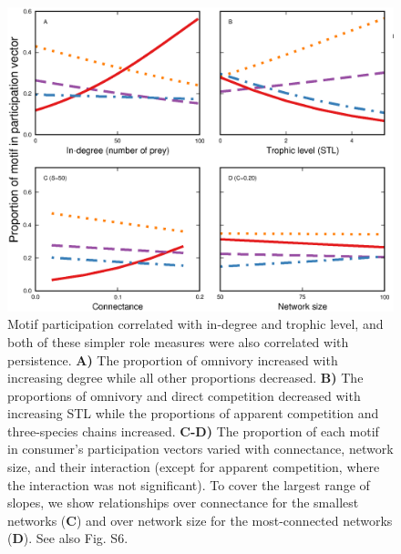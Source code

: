 \documentclass[12pt]{article}
\begin{document}
\begin{spacing}{2.0}
    \begin{figure}[hb!]
        \centering
        \includegraphics[width=\textwidth]{figures/roles_vs_TL.eps}
        \caption{Motif participation correlated with in-degree and trophic level, and both of these simpler role measures were also correlated with persistence. \textbf{A)} The proportion of omnivory increased with increasing degree while all other proportions decreased. \textbf{B)} The proportions of omnivory and direct competition decreased with increasing STL while the proportions of apparent competition and three-species chains increased. \textbf{C-D)} The proportion of each motif in consumer's participation vectors varied with connectance, network size, and their interaction (except for apparent competition, where the interaction was not significant). To cover the largest range of slopes, we show relationships over connectance for the smallest networks (\textbf{C}) and over network size for the most-connected networks (\textbf{D}). See also Fig. S6.}
        \label{fig:motifs_vs_TL_and_deg}
    \end{figure}        






\end{spacing}
\end{document}
